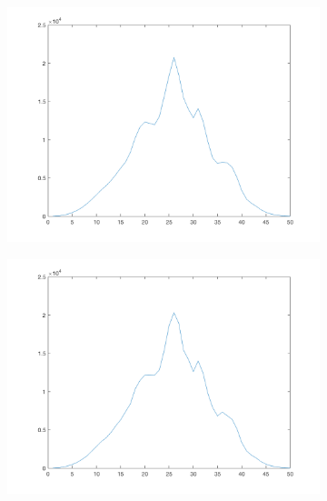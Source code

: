 \begin{figure}[htpb]
\centering
\begin{subfigure}{.25\textwidth}
\includegraphics[width=1\textwidth]{img/ProjXI1sigma0}
\end{subfigure}%
\begin{subfigure}{.25\textwidth}
\includegraphics[width=1\textwidth]{img/ProjXI1sigma75}
\end{subfigure}%
\begin{subfigure}{.25\textwidth}

\end{subfigure}
\end{figure}
